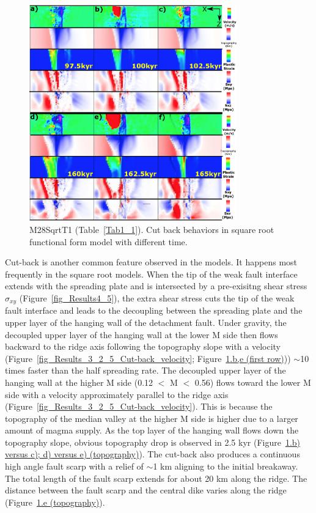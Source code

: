 \begin{figure}[h]
  \centering
    \includegraphics[width=0.8\textwidth]{./Figures/fig_Results4_4_sqrt_cut_back_with_time.eps}
  \caption{M28SqrtT1 (Table~\hyperref[Tab1_1]{\ref{Tab1_1}}). Cut back behaviors in square root functional form model with different time.}
 \label{fig_Results4_4}
\end{figure}   

Cut-back is another common feature observed in the models. It happens most frequently in the square root models. When the tip of the weak fault interface extends with the spreading plate and is intersected by a pre-exisitng shear stress $\sigma_{xy}$ (Figure~\hyperref[fig_Results4_5]{\ref{fig_Results4_5}}), the extra shear stress cuts the tip of the weak fault interface and leads to the decoupling between the spreading plate and the upper layer of the hanging wall of the detachment fault. Under gravity, the decoupled upper layer of the hanging wall at the lower M side then flows backward to the ridge axis following the topography slope with a velocity (Figure~\hyperref[fig_Results_3_2_5_Cut-back_velocity]{\ref{fig_Results_3_2_5_Cut-back_velocity}}; Figure~\hyperref[fig_Results4_4]{\ref{fig_Results4_4}.b,e (first row)})) $\sim$10 times faster than the half spreading rate. The decoupled upper layer of the hanging wall at the higher M side (0.12 $<$ M $<$ 0.56) flows toward the lower M side with a velocity approximately parallel to the ridge axis (Figure~\hyperref[fig_Results_3_2_5_Cut-back_velocity]{\ref{fig_Results_3_2_5_Cut-back_velocity}}). This is because the topography of the median valley at the higher M side is higher due to a larger amount of magma supply. As the top layer of the hanging wall flows down the topography slope, obvious topography drop is observed in 2.5 kyr (Figure~\hyperref[fig_Results4_4]{\ref{fig_Results4_4}.b) versus c); d) versus e) (topography)}). The cut-back also produces a continuous high angle fault scarp with a relief of $\sim$1 km aligning to the initial breakaway. The total length of the fault scarp extends for about 20 km along the ridge. The distance between the fault scarp and the central dike varies along the ridge (Figure~\hyperref[fig_Results4_4]{\ref{fig_Results4_4}.e (topography)}).  

